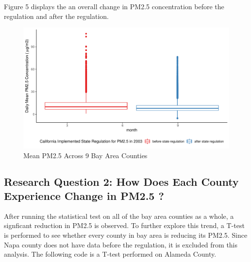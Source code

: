 \documentclass[12pt,]{article}
\newenvironment{Shaded}{\begin{snugshade}}{\end{snugshade}}
\newcommand{\KeywordTok}[1]{\textcolor[rgb]{0.13,0.29,0.53}{\textbf{#1}}}
\newcommand{\DataTypeTok}[1]{\textcolor[rgb]{0.13,0.29,0.53}{#1}}
\newcommand{\FloatTok}[1]{\textcolor[rgb]{0.00,0.00,0.81}{#1}}
\newcommand{\StringTok}[1]{\textcolor[rgb]{0.31,0.60,0.02}{#1}}
\newcommand{\CommentTok}[1]{\textcolor[rgb]{0.56,0.35,0.01}{\textit{#1}}}
\newcommand{\OperatorTok}[1]{\textcolor[rgb]{0.81,0.36,0.00}{\textbf{#1}}}
\newcommand{\NormalTok}[1]{#1}
\begin{document}
Figure 5 displays the an overall change in PM2.5 concentration before
the regulation and after the regulation.

\begin{figure}
\centering
\includegraphics{pm25_files/figure-latex/unnamed-chunk-4-1.pdf}
\caption{Mean PM2.5 Across 9 Bay Area Counties}
\end{figure}

\newpage

\subsection{Research Question 2: How Does Each County Experience Change
in PM2.5
?}\label{research-question-2-how-does-each-county-experience-change-in-pm2.5}

After running the statistical test on all of the bay area counties as a
whole, a signficant reduction in PM2.5 is observed. To further explore
this trend, a T-test is performed to see whether every county in bay
area is reducing its PM2.5. Since Napa county does not have data before
the regulation, it is excluded from this analysis. The following code is
a T-test performed on Alameda County.

\begin{Shaded}
\end{Shaded}
\end{document}
